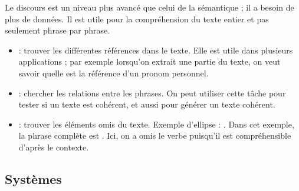 \documentclass{KodeBook}
\begin{document}
Le discours est un niveau plus avancé que celui de la sémantique ; il a besoin de plus de données. 
Il est utile pour la compréhension du texte entier et pas seulement phrase par phrase.
\begin{itemize}
	\item {} : trouver les différentes références dans le texte. 
	Elle est utile dans plusieurs applications ; par exemple lorsqu'on extrait une partie du texte, on veut savoir quelle est la référence d'un pronom personnel.
	\item {} : chercher les relations entre les phrases. 
	On peut utiliser cette tâche pour tester si un texte est cohérent, et aussi pour générer un texte cohérent.
	\item {} : trouver les éléments omis du texte. 
	Exemple d'ellipse : .
	Dans cet exemple, la phrase complète est .
	Ici, on a omis le verbe puisqu'il est compréhensible d'après le contexte.
\end{itemize}

\subsection{Systèmes}
\end{document}
